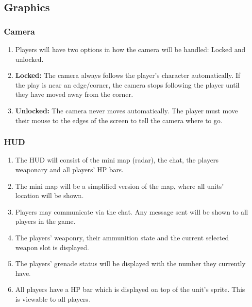 \documentclass[12pt]{article}
\newenvironment{req} {\begin{enumerate}[leftmargin=2.5cm, label = \textbf{REQ \arabic{subsection}.\arabic{subsubsection}.\arabic*:}]} {\end{enumerate}}
\begin{document}
\subsection{Graphics}

\subsubsection{Camera}
\begin{req}
	\item Players will have two options in how the camera will be handled: Locked and unlocked.
	\item \textbf{Locked:} The camera always follows the player's character automatically. If the play is near an edge/corner, the camera stops following the player until they have moved away from the corner.
	\item \textbf{Unlocked:} The camera never moves automatically. The player must move their mouse to the edges of the screen to tell the camera where to go.
\end{req}

\subsubsection{HUD}
\begin{req}
	\item The HUD will consist of the mini map (radar), the chat, the players weaponary and all players' HP bars.
	\item The mini map will be a simplified version of the map, where all units' location will be shown.
	\item Players may communicate via the chat. Any message sent will be shown to all players in the game. 
	\item The players' weaponry, their ammunition state and the current selected weapon slot is displayed.
	\item The players' grenade status will be displayed with the number they currently have.
	\item All players have a HP bar which is displayed on top of the unit's sprite. This is viewable to all players.
\end{req}
\end{document}
